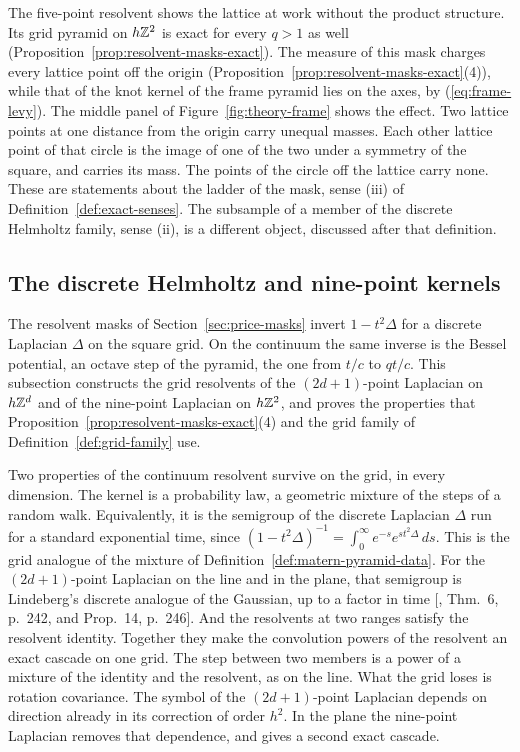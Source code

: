 The five-point resolvent shows the lattice at work without the product structure. Its grid pyramid
on $h\mathbb{Z}^2$ is exact for every $q > 1$ as well (Proposition~\ref{prop:resolvent-masks-exact}). The
\Levy{} measure of this mask charges every lattice point off the origin
(Proposition~\ref{prop:resolvent-masks-exact}(4)), while that of the knot kernel of the frame
pyramid lies on the axes, by (\ref{eq:frame-levy}). The middle panel of
Figure~\ref{fig:theory-frame} shows the effect. Two lattice points at one distance from the origin
carry unequal masses. Each other lattice point of that circle is the image of one of the two under
a symmetry of the square, and carries its mass. The points of the circle off the lattice carry
none. These are statements about
the ladder of the mask, sense (iii) of Definition~\ref{def:exact-senses}. The subsample of a member
of the discrete Helmholtz family, sense (ii), is a different object, discussed after that
definition.

\subsection{The discrete Helmholtz and nine-point kernels}
\label{sec:discrete-helmholtz}

The resolvent masks of Section~\ref{sec:price-masks} invert $1 - t^2\Delta$ for a discrete
Laplacian $\Delta$ on the square grid. On the continuum the same inverse is the Bessel potential,
an octave step of the \Matern{} pyramid, the one from $t/c$ to $qt/c$. This subsection constructs the grid resolvents of the
$(2d+1)$-point Laplacian on $h\mathbb{Z}^d$ and of the nine-point Laplacian on $h\mathbb{Z}^2$, and proves the
properties that Proposition~\ref{prop:resolvent-masks-exact}(4) and the grid family of
Definition~\ref{def:grid-family} use.

Two properties of the continuum resolvent survive on the grid, in every dimension. The kernel is a
probability law, a geometric mixture of the steps of a random walk. Equivalently, it is the
semigroup of the discrete Laplacian $\Delta$ run for a standard exponential time, since
$(1 - t^2\Delta)^{-1} = \int_0^\infty e^{-s}e^{st^2\Delta}\,ds$. This is the grid analogue of the
mixture of Definition~\ref{def:matern-pyramid-data}. For the $(2d+1)$-point Laplacian on the line
and in the plane, that semigroup is Lindeberg's discrete analogue of the Gaussian, up to a factor in
time [, Thm.~6, p.~242, and Prop.~14, p.~246]. And
the resolvents at two
ranges satisfy the resolvent identity. Together they make the convolution powers of the resolvent
an exact cascade on one grid. The step between two members is a power of a mixture of the identity
and the resolvent, as on the line. What the grid loses is rotation covariance. The symbol of the
$(2d+1)$-point Laplacian depends on direction already in its correction of order $h^2$. In the
plane the nine-point Laplacian removes that dependence, and gives a second exact cascade.

